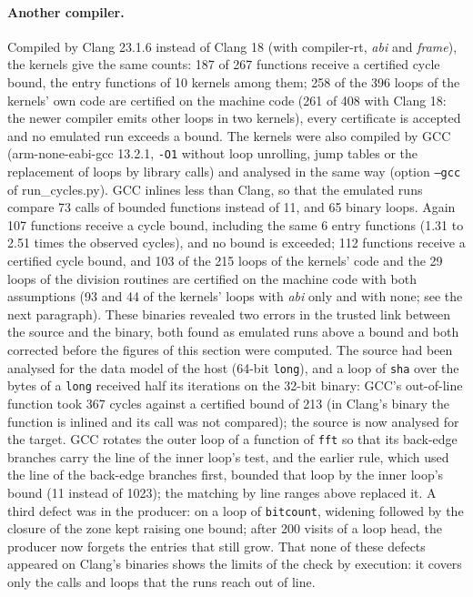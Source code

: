 \documentclass[oneside,english]{amsart}
\numberwithin{equation}{section}
\theoremstyle{plain}
\theoremstyle{definition}
\theoremstyle{plain}
\theoremstyle{plain}
\theoremstyle{remark}
\newcommand{\lean}[1]{{\ttfamily\small #1}}
\begin{document}
\paragraph{Another compiler.} Compiled by Clang 23.1.6 instead of Clang 18 (with compiler-rt, \emph{abi} and \emph{frame}), the kernels give the same counts: 187 of 267 functions receive a certified cycle bound, the entry functions of 10 kernels among them; 258 of the 396 loops of the kernels' own code are certified on the machine code (261 of 408 with Clang 18: the newer compiler emits other loops in two kernels), every certificate is accepted and no emulated run exceeds a bound. The kernels were also compiled by GCC (arm-none-eabi-gcc 13.2.1, \texttt{-O1} without loop unrolling, jump tables or the replacement of loops by library calls) and analysed in the same way (option \texttt{--gcc} of \lean{run\_cycles.py}). GCC inlines less than Clang, so that the emulated runs compare 73 calls of bounded functions instead of 11, and 65 binary loops. Again 107 functions receive a cycle bound, including the same 6 entry functions (1.31 to 2.51 times the observed cycles), and no bound is exceeded; 112 functions receive a certified cycle bound, and 103 of the 215 loops of the kernels' code and the 29 loops of the division routines are certified on the machine code with both assumptions (93 and 44 of the kernels' loops with \emph{abi} only and with none; see the next paragraph). These binaries revealed two errors in the trusted link between the source and the binary, both found as emulated runs above a bound and both corrected before the figures of this section were computed. The source had been analysed for the data model of the host (64-bit \texttt{long}), and a loop of \texttt{sha} over the bytes of a \texttt{long} received half its iterations on the 32-bit binary: GCC's out-of-line function took 367 cycles against a certified bound of 213 (in Clang's binary the function is inlined and its call was not compared); the source is now analysed for the target. GCC rotates the outer loop of a function of \texttt{fft} so that its back-edge branches carry the line of the inner loop's test, and the earlier rule, which used the line of the back-edge branches first, bounded that loop by the inner loop's bound (11 instead of 1023); the matching by line ranges above replaced it. A third defect was in the producer: on a loop of \texttt{bitcount}, widening followed by the closure of the zone kept raising one bound; after 200 visits of a loop head, the producer now forgets the entries that still grow. That none of these defects appeared on Clang's binaries shows the limits of the check by execution: it covers only the calls and loops that the runs reach out of line.
\end{document}
